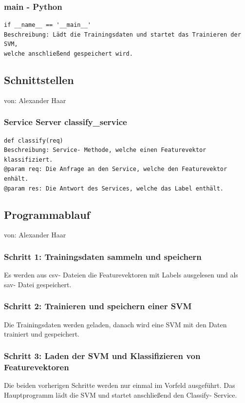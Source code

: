 \documentclass{suturo}
\makeatletter
\newcommand{\chapterauthor}[1]{%
  {\parindent0pt\vspace*{-27pt}%
  \linespread{0}\small\begin{flushright}von: #1\end{flushright}%
  \par\nobreak\vspace*{0pt}}
  \@afterheading%
}
\makeatother
\begin{document}
\subsubsection{main - Python}
\begin{verbatim}
if __name__ == '__main__'
Beschreibung: Lädt die Trainingsdaten und startet das Trainieren der SVM, 
welche anschließend gespeichert wird.
\end{verbatim}

\subsection{Schnittstellen}
\chapterauthor{Alexander Haar}

\subsubsection{Service Server classify\_service}
\begin{verbatim}
def classify(req)
Beschreibung: Service- Methode, welche einen Featurevektor klassifiziert.
@param req: Die Anfrage an den Service, welche den Featurevektor enhält.  
@param res: Die Antwort des Services, welche das Label enthält.
\end{verbatim}

\subsection{Programmablauf}
\chapterauthor{Alexander Haar}
\subsubsection{Schritt 1: Trainingsdaten sammeln und speichern}
Es werden aus csv- Dateien die Featurevektoren mit Labels ausgelesen und als sav- Datei gespeichert.

\subsubsection{Schritt 2: Trainieren und speichern einer SVM} 
Die Trainingsdaten werden geladen, danach wird eine SVM mit den Daten trainiert und gespeichert.

\subsubsection{Schritt 3: Laden der SVM und Klassifizieren von Featurevektoren}
Die beiden vorherigen Schritte werden nur einmal im Vorfeld ausgeführt. Das Hauptprogramm lädt die SVM und startet anschließend den Classify- Service.
\end{document}
